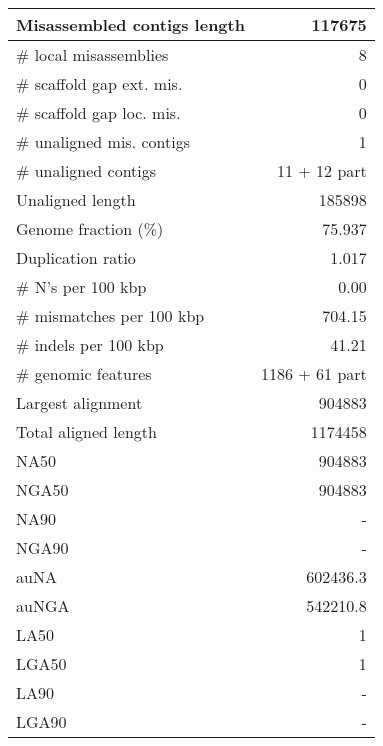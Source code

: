 \documentclass[12pt,a4paper]{article}
\begin{document}
\begin{table}[ht]
\begin{center}
\begin{tabular}{|l*{1}{|r}|}
Misassembled contigs length & 117675 \\ \hline
\# local misassemblies & 8 \\ \hline
\# scaffold gap ext. mis. & 0 \\ \hline
\# scaffold gap loc. mis. & 0 \\ \hline
\# unaligned mis. contigs & 1 \\ \hline
\# unaligned contigs & 11 + 12 part \\ \hline
Unaligned length & 185898 \\ \hline
Genome fraction (\%) & 75.937 \\ \hline
Duplication ratio & 1.017 \\ \hline
\# N's per 100 kbp & 0.00 \\ \hline
\# mismatches per 100 kbp & 704.15 \\ \hline
\# indels per 100 kbp & 41.21 \\ \hline
\# genomic features & 1186 + 61 part \\ \hline
Largest alignment & 904883 \\ \hline
Total aligned length & 1174458 \\ \hline
NA50 & 904883 \\ \hline
NGA50 & 904883 \\ \hline
NA90 & - \\ \hline
NGA90 & - \\ \hline
auNA & 602436.3 \\ \hline
auNGA & 542210.8 \\ \hline
LA50 & 1 \\ \hline
LGA50 & 1 \\ \hline
LA90 & - \\ \hline
LGA90 & - \\ \hline
\end{tabular}
\end{center}
\end{table}
\end{document}
